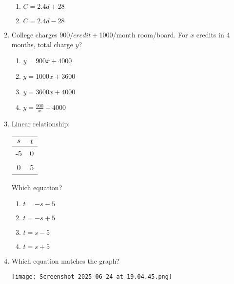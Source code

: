 \documentclass[12pt]{exam}
\begin{document}
\begin{enumerate}
\begin{enumerate}[label=\Alph*)]
        \item $C = 2.4d + 28$
        \item $C = 2.4d - 28$
    \end{enumerate}
    \item College charges $900/credit + $1000/month room/board. For $x$ credits in 4 months, total charge $y$?
    \begin{enumerate}[label=\Alph*)]
        \item $y = 900x + 4000$
        \item $y = 1000x + 3600$
        \item $y = 3600x + 4000$
        \item $y = \frac{900}{x} + 4000$
    \end{enumerate}
    \item Linear relationship:
    \begin{center}
        \begin{tabular}{|c|c|}
            \hline
            $s$ & $t$ \\
            \hline
            -5 & 0 \\
            0 & 5 \\
            \hline
        \end{tabular}
    \end{center}
    Which equation?
    \begin{enumerate}[label=\Alph*)]
        \item $t = -s - 5$
        \item $t = -s + 5$
        \item $t = s - 5$
        \item $t = s + 5$
    \end{enumerate}
    \item Which equation matches the graph?
    \begin{center}
            \centering
            \texttt{[image: Screenshot 2025-06-24 at 19.04.45.png]}


\end{center}
\end{enumerate}
\end{document}
